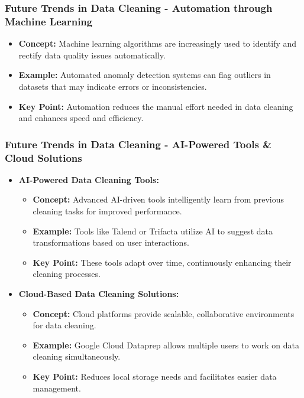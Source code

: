 \documentclass[aspectratio=169]{beamer}
\begin{document}
\begin{frame}[fragile]
  \frametitle{Future Trends in Data Cleaning - Automation through Machine Learning}
  \begin{itemize}
    \item \textbf{Concept:} 
      Machine learning algorithms are increasingly used to identify and rectify data quality issues automatically.
    \item \textbf{Example:} 
      Automated anomaly detection systems can flag outliers in datasets that may indicate errors or inconsistencies.
    \item \textbf{Key Point:} 
      Automation reduces the manual effort needed in data cleaning and enhances speed and efficiency.
  \end{itemize}
\end{frame}

\begin{frame}[fragile]
  \frametitle{Future Trends in Data Cleaning - AI-Powered Tools & Cloud Solutions}
  \begin{itemize}
    \item \textbf{AI-Powered Data Cleaning Tools:}
      \begin{itemize}
        \item \textbf{Concept:} Advanced AI-driven tools intelligently learn from previous cleaning tasks for improved performance.
        \item \textbf{Example:} Tools like Talend or Trifacta utilize AI to suggest data transformations based on user interactions.
        \item \textbf{Key Point:} These tools adapt over time, continuously enhancing their cleaning processes.
      \end{itemize}
  
    \item \textbf{Cloud-Based Data Cleaning Solutions:}
      \begin{itemize}
        \item \textbf{Concept:} Cloud platforms provide scalable, collaborative environments for data cleaning.
        \item \textbf{Example:} Google Cloud Dataprep allows multiple users to work on data cleaning simultaneously.
        \item \textbf{Key Point:} Reduces local storage needs and facilitates easier data management.
      \end{itemize}
  \end{itemize}
\end{frame}
\end{document}
